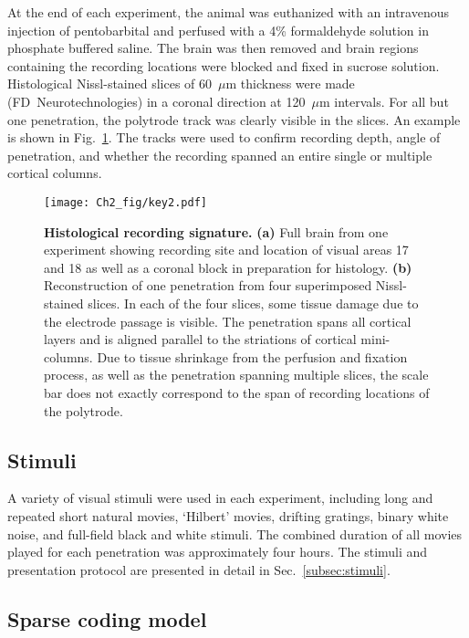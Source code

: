 At the end of each experiment, the animal was euthanized with an
intravenous injection of pentobarbital and perfused with a 4\%
formaldehyde solution in phosphate buffered saline. The brain was then
removed and brain regions containing the recording locations were
blocked and fixed in sucrose solution. Histological Nissl-stained
slices of 60~$\mu$m thickness were made (FD~Neurotechnologies) in a
coronal direction at 120~$\mu$m intervals. For all but one
penetration, the polytrode track was clearly visible in the slices. An
example is shown in Fig.~\ref{fig:histology}. The tracks were used to
confirm recording depth, angle of penetration, and whether the
recording spanned an entire single or multiple cortical columns.

\begin{figure}[ht!] 
  \centering
  \texttt{[image: Ch2\_fig/key2.pdf]} 
  \caption{\textbf{Histological recording signature.} \textbf{(a)}
    Full brain from one experiment showing recording site and location
    of visual areas 17 and 18 as well as a coronal block in
    preparation for histology. \textbf{(b)} Reconstruction of one
    penetration from four superimposed Nissl-stained slices. In each
    of the four slices, some tissue damage due to the electrode
    passage is visible. The penetration spans all cortical layers and
    is aligned parallel to the striations of cortical mini-columns. Due
    to tissue shrinkage from the perfusion and fixation process, as
    well as the penetration spanning multiple slices,
    the scale bar does not exactly correspond to the span of recording
    locations of the polytrode.}
  \label{fig:histology} 
\end{figure}
\clearpage

\subsection{Stimuli}

A variety of visual stimuli were used in each experiment, including
long and repeated short natural movies, `Hilbert' movies, drifting
gratings, binary white noise, and full-field black and white
stimuli. The combined duration of all movies played for each
penetration was approximately four hours. The stimuli and presentation
protocol are presented in detail in Sec.~\ref{subsec:stimuli}.

\subsection{Sparse coding model}
\label{sec:sparsealg}

